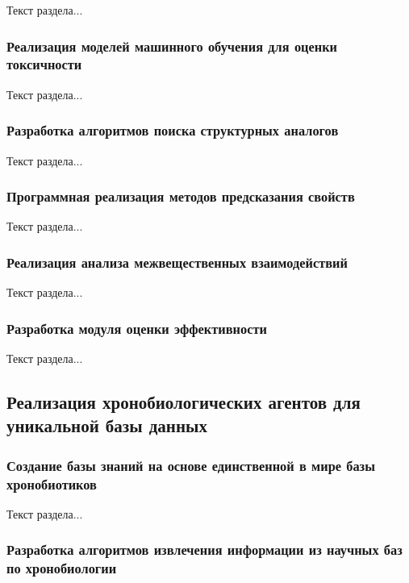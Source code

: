 Текст раздела...

\subsubsection{Реализация моделей машинного обучения для оценки токсичности}

Текст раздела...

\subsubsection{Разработка алгоритмов поиска структурных аналогов}

Текст раздела...

\subsubsection{Программная реализация методов предсказания свойств}

Текст раздела...

\subsubsection{Реализация анализа межвещественных взаимодействий}

Текст раздела...

\subsubsection{Разработка модуля оценки эффективности}

Текст раздела...

\subsection{Реализация хронобиологических агентов для уникальной базы данных}

\subsubsection{Создание базы знаний на основе единственной в мире базы хронобиотиков}

Текст раздела...

\subsubsection{Разработка алгоритмов извлечения информации из научных баз по хронобиологии}

